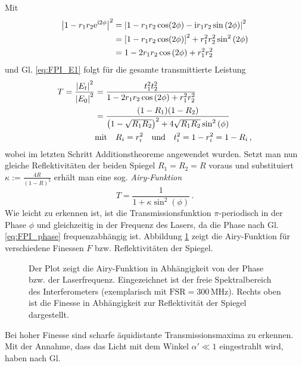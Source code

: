 Mit
\begin{equation}\label{eq:betrags-quadrat_imag}
	\begin{split}
		\left|1-r_1r_2\mathrm{e}^{\mathrm{i}2\phi}\right|^2&=\left|1-r_1r_2\cos(2\phi)-\mathrm{i}r_1r_2\sin{(2\phi})\right|^2\\
		&=\left[1-r_1r_2\cos(2\phi)\right]^2+r_1^2r_2^2\sin^2{(2\phi)}\\
		&=1-2r_1r_2\cos{(2\phi)}+r_1^2r_2^2
	\end{split}
\end{equation}
und Gl. \eqref{eq:FPI_E1} folgt für die gesamte transmittierte Leistung
\begin{equation}\label{eq:FPI_transmission}
	\begin{split}
		T=\frac{\left|E_t\right|^2}{\left|E_0\right|^2}
		&=\frac{t_1^2t_2^2}{1-2r_1r_2\cos{(2\phi)}+r_1^2r_2^2}\\
		&=\frac{(1-R_1)(1-R_2)}{\left(1-\sqrt{R_1R_2}\right)^2+4\sqrt{R_1R_2}\sin^2{(\phi)}}\\
		&\text{mit}\quad
		R_i=r_i^2
		\quad\text{und}\quad
		t_i^2=1-r_i^2=1-R_i\,,
	\end{split}
\end{equation}
wobei im letzten Schritt Additionstheoreme angewendet wurden.
Setzt man nun gleiche Reflektivitäten der beiden Spiegel $R_1=R_2=R$ voraus und
substituiert $\kappa:=\frac{4R}{(1-R)^2}$ erhält man eine sog.
\textit{Airy-Funktion}
\begin{equation}\label{eq:FPI_airy-funktion}
	T=\frac{1}{1+\kappa\sin^2{(\phi)}}\,.
\end{equation}
Wie leicht zu erkennen ist, ist die Transmissionsfunktion $\pi$-periodisch in
der Phase $\phi$ und gleichzeitig in der Frequenz des Lasers, da die Phase nach
Gl. \eqref{eq:FPI_phase} frequenzabhängig ist. Abbildung
\ref{fig:airy-funktion} zeigt die Airy-Funktion für verschiedene Finessen
$F$ bzw. Reflektivitäten der Spiegel.
\begin{figure}[h]
	\centering
	\footnotesize
	
	\caption[Airy-Funktion]{Der Plot zeigt die Airy-Funktion
	in Abhängigkeit von der Phase bzw.
	der Laserfrequenz. Eingezeichnet ist
	der freie Spektralbereich des
	Interferometers (exemplarisch mit $\text{FSR}=300\,$MHz). Rechts oben ist die
	Finesse in Abhängigkeit zur
	Reflektivität der Spiegel dargestellt.}\label{fig:airy-funktion}
\end{figure}
Bei hoher Finesse sind scharfe
äquidistante Transmissionsmaxima zu erkennen. Mit der Annahme, dass das Licht
mit dem Winkel $\alpha'\ll1$ eingestrahlt wird, haben nach Gl.
